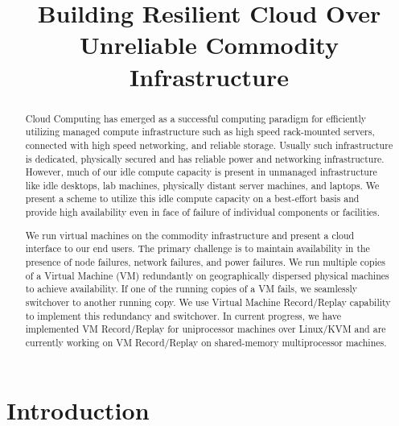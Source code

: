 \documentclass[preprint,9pt]{sigplanconf}
\begin{document}


\title{Building Resilient Cloud Over Unreliable Commodity Infrastructure}

\maketitle

\begin{abstract}
Cloud Computing has emerged as a successful computing paradigm for efficiently utilizing managed compute infrastructure such as high speed rack-mounted servers, connected with high speed networking, and reliable storage. Usually such infrastructure is dedicated, physically secured and has reliable power and networking infrastructure. However, much of our idle compute capacity is present in unmanaged infrastructure like idle desktops, lab machines, physically distant server machines, and laptops. We present a scheme to utilize this idle compute capacity on a best-effort basis and provide high availability even in face of failure of individual components or facilities.

We run virtual machines on the commodity infrastructure and present a cloud interface to our end users. The primary challenge is to maintain availability in the presence of node failures, network failures, and power failures. We run multiple copies of a Virtual Machine (VM) redundantly on geographically dispersed physical machines to achieve availability. If one of the running copies of a VM fails, we seamlessly switchover to another running copy. We use Virtual Machine Record/Replay capability to implement this redundancy and switchover. In current progress, we have implemented VM Record/Replay for uniprocessor machines over Linux/KVM and are currently working on VM Record/Replay on shared-memory multiprocessor machines.
\end{abstract}


\section{Introduction}
\label{sec:intro}
\cite{agesen_vmm_benchmarking}
\end{document}
